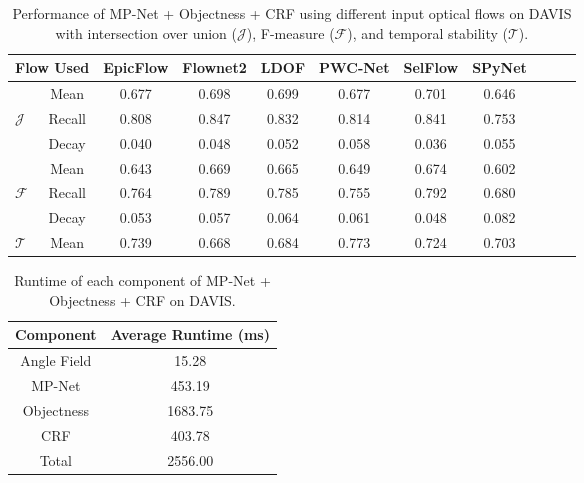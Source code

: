 \documentclass[10pt,letterpaper]{article}
\begin{document}
\begin{table*}
\footnotesize
\begin{center}
\begin{tabular}{l | c | c cccccccc}
\hline
\multicolumn{2}{c|}{Flow Used} & EpicFlow & Flownet2 & LDOF & PWC-Net & SelFlow & SPyNet \\ \hline
                & Mean       & 0.677                   & 0.698                   & 0.699               & 0.677                  & 0.701                  & 0.646                 \\
\textit{$\mathcal{J}$}      & Recall     & 0.808                   & 0.847                   & 0.832               & 0.814                  & 0.841                  & 0.753                 \\
                & Decay      & 0.040                   & 0.048                   & 0.052               & 0.058                  & 0.036                  & 0.055                 \\ \hline
                & Mean       & 0.643                   & 0.669                   & 0.665               & 0.649                  & 0.674                  & 0.602                 \\
\textit{$\mathcal{F}$}      & Recall     & 0.764                   & 0.789                   & 0.785               & 0.755                  & 0.792                  & 0.680                 \\
                & Decay      & 0.053                   & 0.057                   & 0.064               & 0.061                  & 0.048                  & 0.082                 \\ \hline
\textit{$\mathcal{T}$}      & Mean       & 0.739                   & 0.668                   & 0.684               & 0.773                  & 0.724                  & 0.703                 \\ \hline
\end{tabular}
\caption{Performance of MP-Net + Objectness + CRF using different input optical flows on DAVIS with intersection over
union ($\mathcal{J}$), F-measure ($\mathcal{F}$), and temporal stability
($\mathcal{T}$).}
\vspace{-0.7cm}
\end{center}
\end{table*}

\begin{table*}
\footnotesize
\begin{center}
\begin{tabular}{c|c}
\hline
Component   & Average Runtime (ms) \\ \hline
Angle Field & 15.28                \\
MP-Net      & 453.19               \\
Objectness  & 1683.75              \\
CRF         & 403.78               \\
Total       & 2556.00
\end{tabular}
\caption{Runtime of each component of MP-Net + Objectness + CRF on DAVIS.}
\vspace{-0.7cm}
\end{center}
\end{table*}
\end{document}
